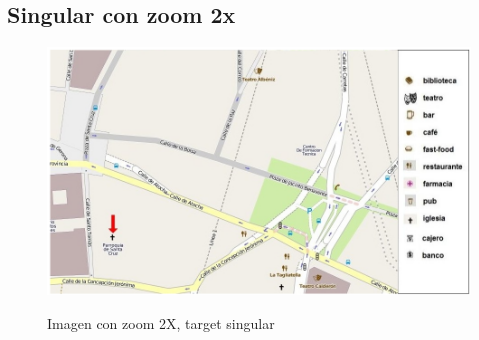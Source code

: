 \subsection{Singular con zoom 2x}

\begin{figure}
\centering
\includegraphics[width=\textwidth]{images/corpus/mapa16.png}\\[0pt]
\caption{Imagen con zoom 2X, target singular}
\label{mapa-zoom2x}
\end{figure}

